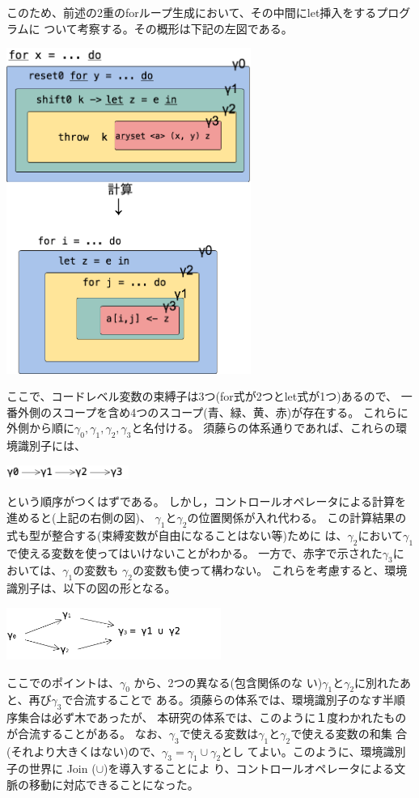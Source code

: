 このため、前述の2重のforループ生成において、その中間にlet挿入をするプログラムに
ついて考察する。その概形は下記の左図である。
\begin{center}
  \includegraphics[clip,width=8cm]{./img/ecex_for_non_gamma.png}
\end{center}
ここで、コードレベル変数の束縛子は3つ(for式が2つとlet式が1つ)あるので、
一番外側のスコープを含め4つのスコープ(青、緑、黄、赤)が存在する。
これらに外側から順に$\gamma_0,\gamma_1,\gamma_2,\gamma_3$と名付ける。
須藤らの体系通りであれば、これらの環境識別子には、
\begin{center}
  \includegraphics[clip,width=4cm]{./img/gamma_normal.png}
\end{center}
という順序がつくはずである。
しかし，コントロールオペレータによる計算を進めると(上記の右側の図)、
$\gamma_1$と$\gamma_2$の位置関係が入れ代わる。
この計算結果の式も型が整合する(束縛変数が自由になることはない等)ために
は、$\gamma_2$において$\gamma_1$で使える変数を使ってはいけないことがわかる。
一方で、赤字で示された$\gamma_3$においては、$\gamma_1$の変数も
$\gamma_2$の変数も使って構わない。
これらを考慮すると、環境識別子は、以下の図の形となる。
\begin{center}
  \includegraphics[clip,width=7cm]{./img/gamma.png}
\end{center}
ここでのポイントは、$\gamma_0$ から、2つの異なる(包含関係のな
い)$\gamma_1$と$\gamma_2$に別れたあと、再び$\gamma_3$で合流することで
ある。須藤らの体系では、環境識別子のなす半順序集合は必ず木であったが、
本研究の体系では、このように１度わかれたものが合流することがある。
なお、$\gamma_3$で使える変数は$\gamma_1$と$\gamma_2$で使える変数の和集
合(それより大きくはない)ので、$\gamma_3 = \gamma_1 \cup \gamma_2$とし
てよい。このように、環境識別子の世界に Join ($\cup$)を導入することによ
り、コントロールオペレータによる文脈の移動に対応できることになった。


